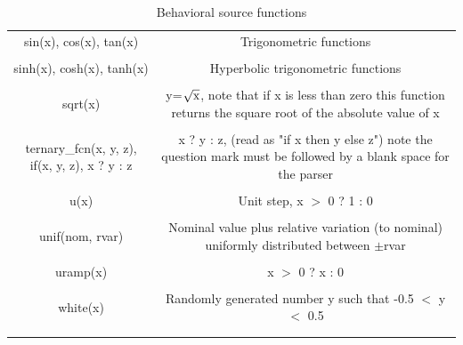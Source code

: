 \begin{longtable}{c c}
sin(x), cos(x), tan(x) & \begin{minipage}{20em}
Trigonometric functions
\end{minipage}\\ \\

sinh(x), cosh(x), tanh(x) & \begin{minipage}{20em}
Hyperbolic trigonometric functions
\end{minipage}\\ \\

sqrt(x) & \begin{minipage}{20em}
y=$\sqrt{\rm{x}}$, note that if x is less than zero this function returns the square root of the absolute value of x
\end{minipage}\\ \\


ternary\_fcn(x, y, z), if(x, y, z), x ? y : z & \begin{minipage}{20em}
x ? y : z, (read as "if x then y else z") note the question mark must be followed by a blank space for the parser
\end{minipage}\\ \\

u(x) & \begin{minipage}{20em}
Unit step, x $>$ 0 ? 1 : 0
\end{minipage}\\ \\

unif(nom, rvar) & \begin{minipage}{20em}
Nominal value plus relative variation (to nominal) uniformly distributed between $\pm$rvar
\end{minipage}\\ \\

uramp(x) & \begin{minipage}{20em}
x $>$ 0 ? x : 0
\end{minipage}\\ \\

white(x) & \begin{minipage}{20em}
Randomly generated number y such that -0.5 $<$ y $<$ 0.5
\end{minipage}\\ \\[1ex] %
\hline %

\caption{Behavioral source functions}
\label {tab:paramfuncs}
\end{longtable}

